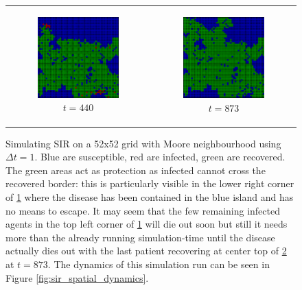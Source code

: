 \begin{figure}
\begin{center}
\begin{tabular}{c c}
		\begin{subfigure}[b]{0.4\textwidth}
			\centering
			\includegraphics[width=.6\textwidth, angle=0]{./../shared/fig/spatial/SIR_spatial_52x52_440time.png}
			\caption{$t = 440$}
			\label{fig:sir_spatial_440}
		\end{subfigure}
		
		& 
		
		\begin{subfigure}[b]{0.4\textwidth}
			\centering
			\includegraphics[width=.6\textwidth, angle=0]{./../shared/fig/spatial/SIR_spatial_52x52_873time.png}
			\caption{$t = 873$}
			\label{fig:sir_spatial_873}
		\end{subfigure}
	\end{tabular}
	
	\caption{Simulating SIR on a 52x52 grid with Moore neighbourhood using $\Delta t = 1$. Blue are susceptible, red are infected, green are recovered. The green areas act as protection as infected cannot cross the recovered border: this is particularly visible in the lower right corner of \ref{fig:sir_spatial_440} where the disease has been contained in the blue island and has no means to escape. It may seem that the few remaining infected agents in the top left corner of \ref{fig:sir_spatial_440} will die out soon but still it needs more than the already running simulation-time until the disease actually dies out with the last patient recovering at center top of \ref{fig:sir_spatial_873} at $t = 873$. The dynamics of this simulation run can be seen in Figure \ref{fig:sir_spatial_dynamics}.} 
	\label{fig:sir_spatial}
\end{center}
\end{figure}

